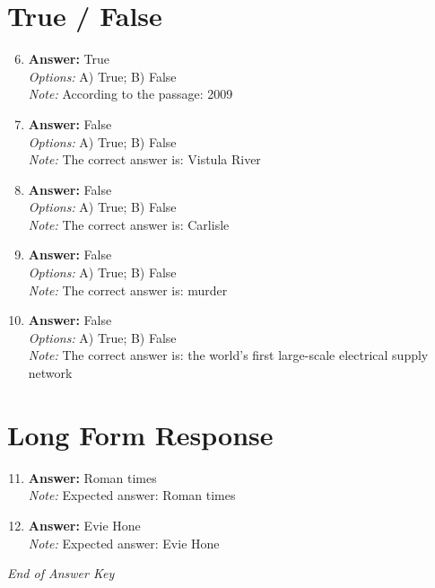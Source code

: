 \documentclass[12pt]{article}
\begin{document}
\section*{True / False}
\begin{enumerate}[label=\arabic*.]
\setcounter{enumi}{5}
\item \textbf{Answer:} True
\\ \textit{Options:} A) True; B) False
\\ \textit{Note:} According to the passage: 2009
\item \textbf{Answer:} False
\\ \textit{Options:} A) True; B) False
\\ \textit{Note:} The correct answer is: Vistula River
\item \textbf{Answer:} False
\\ \textit{Options:} A) True; B) False
\\ \textit{Note:} The correct answer is: Carlisle
\item \textbf{Answer:} False
\\ \textit{Options:} A) True; B) False
\\ \textit{Note:} The correct answer is: murder
\item \textbf{Answer:} False
\\ \textit{Options:} A) True; B) False
\\ \textit{Note:} The correct answer is: the world's first large-scale electrical supply network
\end{enumerate}

\section*{Long Form Response}
\begin{enumerate}[label=\arabic*.]
\setcounter{enumi}{10}
\item \textbf{Answer:} Roman times
\\ \textit{Note:} Expected answer: Roman times
\item \textbf{Answer:} Evie Hone
\\ \textit{Note:} Expected answer: Evie Hone
\end{enumerate}

\vfill
\noindent\textit{End of Answer Key}
\end{document}
